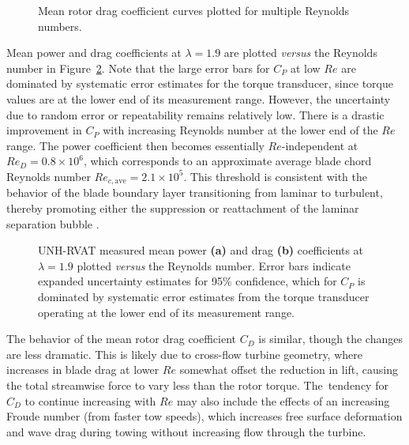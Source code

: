 \begin{figure}[ht]
\centering


\caption{Mean rotor drag coefficient curves plotted for multiple Reynolds
    numbers.}

\label{fig:cd-curves}
\end{figure}

Mean power and drag coefficients at $\lambda=1.9$ are plotted \textit{versus}
the Reynolds number in Figure~\ref{fig:perf-Re-dep}. Note that the large error
bars for $C_P$ at low $Re$ are dominated by systematic error estimates for the
torque transducer, since torque values are at the lower end of its measurement
range. However, the uncertainty due to random error or repeatability remains
relatively low. There is a drastic improvement in $C_P$ with increasing Reynolds
number at the lower end of the $Re$ range. The power coefficient then becomes
essentially $Re$-independent at $Re_D = 0.8 \times 10^6$, which corresponds to
an approximate average blade chord Reynolds number $Re_{c, \mathrm{ave}} = 2.1
\times 10^5$. This threshold is consistent with the behavior of the blade
boundary layer transitioning from laminar to turbulent, thereby promoting either
the suppression or reattachment of the laminar separation bubble
\cite{Lissaman1983}.


\begin{figure}[ht]
\centering


\caption{UNH-RVAT measured mean power \textbf{(a)} and drag \textbf{(b)}
    coefficients at $\lambda=1.9$ plotted \textit{versus} the Reynolds number. Error
    bars indicate expanded uncertainty estimates for 95\% confidence, which for
    $C_P$ is dominated by systematic error estimates from the torque transducer
    operating at the lower end of its measurement range.}

\label{fig:perf-Re-dep}
\end{figure}

The behavior of the mean rotor drag coefficient $C_D$ is similar, though the
changes are less dramatic. This is likely due to cross-flow turbine geometry,
where increases in blade drag at lower $Re$ somewhat offset the reduction in
lift, causing the total streamwise force to vary less than the rotor torque.
The~tendency for $C_D$ to continue increasing with $Re$ may also include the
effects of an increasing Froude number (from faster tow speeds), which increases
free surface deformation and wave drag during towing without increasing flow
through the turbine.


